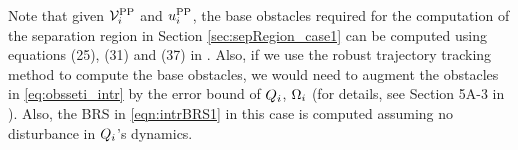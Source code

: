 \begin{remark}
Note that given $\mathcal{V}^{\text{PP}}_{i}$ and ${u^{\text{PP}}_{i}}$, the base obstacles required for the computation of the separation region in Section \ref{sec:sepRegion_case1} can be computed using equations (25), (31) and (37) in \cite{chen2016robust}. Also, if we use the robust trajectory tracking method to compute the base obstacles, we would need to augment the obstacles in \eqref{eq:obsseti_intr} by the error bound of $Q_i$, $\Omega_i$ (for details, see Section 5A-3 in \cite{chen2016robust}). Also, the BRS in \eqref{eqn:intrBRS1} in this case is computed assuming no disturbance in $Q_i$'s dynamics.
\end{remark}